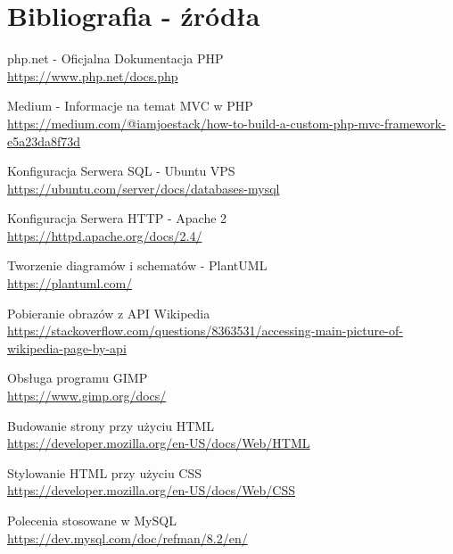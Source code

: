 
\section{Bibliografia - źródła }

\begin{thebibliography}{9}
    php.net - Oficjalna Dokumentacja PHP\\
    \url{https://www.php.net/docs.php}

    Medium - Informacje na temat MVC w PHP\\
    \url{https://medium.com/@iamjoestack/how-to-build-a-custom-php-mvc-framework-e5a23da8f73d}

    Konfiguracja Serwera SQL - Ubuntu VPS\\
    \url{https://ubuntu.com/server/docs/databases-mysql}


    Konfiguracja Serwera HTTP -  Apache 2\\
    \url{https://httpd.apache.org/docs/2.4/}

    Tworzenie diagramów i schematów - PlantUML\\
    \url{https://plantuml.com/}


    Pobieranie obrazów z API Wikipedia\\
    \url{https://stackoverflow.com/questions/8363531/accessing-main-picture-of-wikipedia-page-by-api}


    Obsługa programu GIMP\\
    \url{https://www.gimp.org/docs/}

    Budowanie strony przy użyciu HTML\\
    \url{https://developer.mozilla.org/en-US/docs/Web/HTML}

    Stylowanie HTML przy użyciu CSS\\
    \url{https://developer.mozilla.org/en-US/docs/Web/CSS}

    Polecenia stosowane w MySQL\\
    \url{https://dev.mysql.com/doc/refman/8.2/en/}


    
\end{thebibliography}

